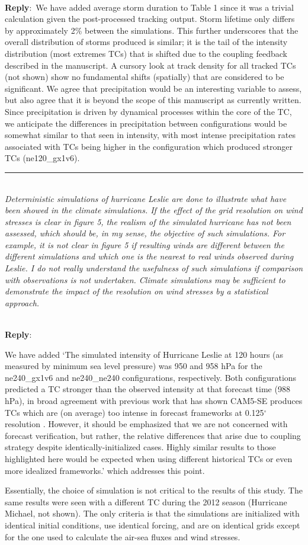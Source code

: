 \documentclass{article}
\newcommand{\genDisc}[1]{\medskip \hrule \noindent \\
               {\itshape #1}}
\newcommand{\reply}{\noindent \\ \textbf{Reply}:\ }
\newcommand{\degree}{$^{\circ}$}
\begin{document}
\reply{We have added average storm duration to Table 1 since it was a trivial calculation given the post-processed tracking output. Storm lifetime only differs by approximately 2\% between the simulations. This further underscores that the overall distribution of storms produced is similar; it is the tail of the intensity distribution (most extremes TCs) that is shifted due to the coupling feedback described in the manuscript. A cursory look at track density for all tracked TCs (not shown) show no fundamental shifts (spatially) that are considered to be significant. We agree that precipitation would be an interesting variable to assess, but also agree that it is beyond the scope of this manuscript as currently written. Since precipitation is driven by dynamical processes within the core of the TC, we anticipate the differences in precipitation between configurations would be somewhat similar to that seen in intensity, with most intense precipitation rates associated with TCs being higher in the configuration which produced stronger TCs (ne120\_gx1v6).}

\genDisc{Deterministic simulations of hurricane Leslie are done to illustrate what have been showed in the climate simulations. If the effect of the grid resolution on wind stresses is clear in figure 5, the realism of the simulated hurricane has not been assessed, which should be, in my sense, the objective of such simulations. For example, it is not clear in figure 5 if resulting winds are different between the different simulations and which one is the nearest to real winds observed during Leslie. I do not really understand the usefulness of such simulations if comparison with observations is not undertaken. Climate simulations may be sufficient to demonstrate the impact of the resolution on wind stresses by a statistical approach.}

\reply{We have added `The simulated intensity of Hurricane Leslie at 120 hours (as measured by minimum sea level pressure) was 950 and 958 hPa for the ne240\_gx1v6 and ne240\_ne240 configurations, respectively. Both configurations predicted a TC stronger than the observed intensity at that forecast time (988 hPa), in broad agreement with previous work that has shown CAM5-SE produces TCs which are (on average) too intense in forecast frameworks at 0.125\degree{} resolution \citep{Zarzycki2015TCForecast}. However, it should be emphasized that we are not concerned with forecast verification, but rather, the relative differences that arise due to coupling strategy despite identically-initialized cases. Highly similar results to those highlighted here would be expected when using different historical TCs or even more idealized frameworks.' which addresses this point.

Essentially, the choice of simulation is not critical to the results of this study. The same results were seen with a different TC during the 2012 season (Hurricane Michael, not shown). The only criteria is that the simulations are initialized with identical initial conditions, use identical forcing, and are on identical grids except for the one used to calculate the air-sea fluxes and wind stresses.}
\end{document}
